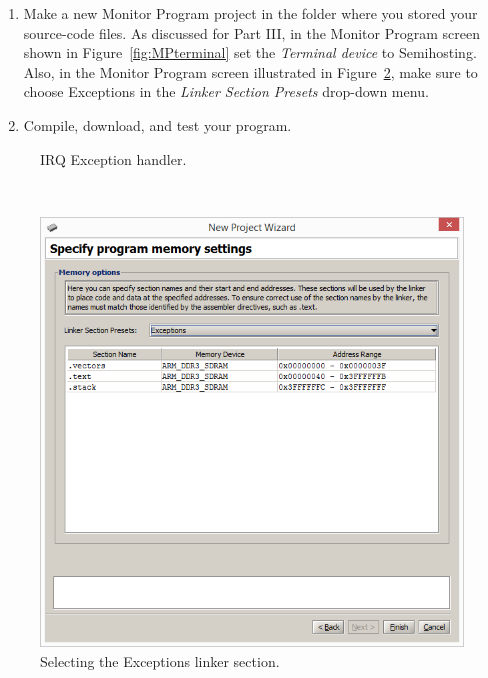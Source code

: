 \documentclass[epsfig,10pt,fullpage]{article}
\newcommand{\CommonDocsPath}{../../../../common/docs}
\begin{document}
\begin{enumerate}
\item
Make a new Monitor Program project in the folder where you stored your source-code files.
As discussed for Part III, in the Monitor Program screen shown in 
Figure~\ref{fig:MPterminal} set the {\it Terminal device} to {\sf Semihosting}.
Also, in the Monitor Program screen illustrated in Figure~\ref{fig:exceptions}, make sure 
to choose {\sf Exceptions} in the {\it Linker Section Presets} drop-down menu.

\item
Compile, download, and test your program. 
\end{enumerate}

\begin{figure}[H]
\begin{center}

\end{center}
\caption{IRQ Exception handler.}
\label{fig:irq_code}
\end{figure}

~\\
\begin{figure}[htb]
	\begin{center}
	\includegraphics[scale=0.58]{figures/exceptions_C.png}
	\end{center}
	\vspace{-0.25cm}\caption{Selecting the {\sf Exceptions} linker section.}
\label{fig:exceptions}
\end{figure}



\end{document}
